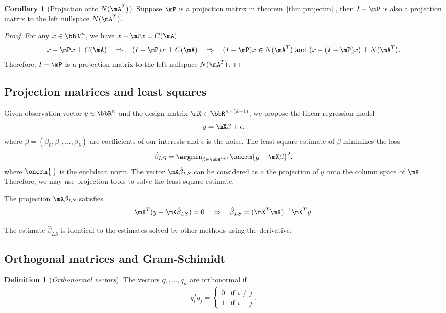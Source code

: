 \documentclass[11pt]{article}
\theoremstyle{plain}
\theoremstyle{definition}
\newtheorem{defn}{Definition}
\newtheorem{cor}{Corollary}
\begin{document}
\begin{cor}[Projection onto $N(\mA^T)$]\label{cor:iprojectm}
	Suppose $\mP$ is a projection matrix in theorem~\ref{thm:projectm} , then $I-\mP$ is also a projection matrix to the left nullspace $N(\mA^T)$. 
\end{cor}

\begin{proof}
	For any $x \in \bbR^m$, we have $x - \mP x \perp C(\mA)$
	\[ x - \mP x \perp C(\mA) \quad \Rightarrow \quad (I-\mP)x \perp C(\mA) \quad \Rightarrow \quad  (I-\mP)x \in N(\mA^T) \text{ and } (x - (I-\mP)x) \perp N(\mA^T). \]
	Therefore, $I-\mP$ is a projection matrix to the left nullspace $N(\mA^T)$.
\end{proof}

\subsection{Projection matrices and least squares}
Given observation vector $y \in \bbR^n$ and the design matrix $\mX \in \bbR^{n \times (k+1)}$, we propose the linear regression model
\[ y = \mX \beta +\epsilon,\]
where $\beta = (\beta_0,\beta_1,...,\beta_k)$ are coefficients of our interests and $\epsilon$ is the noise. The least square estimate of $\beta$ minimizes the loss
\[  \hat \beta_{LS} = \argmin_{\beta \in \bbR^{k+1}} \onorm{y - \mX \beta}^2, \]
where $\onorm{\cdot}$ is the euclidean norm. The vector $\mX 
\hat \beta_{LS}$ can be considered as a the projection of $y$ onto the column space of $\mX$. Therefore, we may use projection tools to solve the least square estimate. 

The projection $\mX \hat \beta_{LS}$ satisfies
\[ \mX^T( y - \mX \hat \beta_{LS} ) = 0 \quad \Rightarrow \quad \hat \beta_{LS} = (\mX^T \mX)^{-1} \mX^T y. \]

The estimate $\hat \beta_{LS}$ is identical to the estimates solved by other methods  using the derivative. 

\subsection{Orthogonal matrices and Gram-Schimidt}
\begin{defn}[\textit{Orthonormal vectors}]\label{def:othronov}
	The vectors $q_1,...,q_n$ are orthonormal if
	\begin{align}
		q_i^T q_j = \begin{cases}
			0& \text{if } i\neq j\\
			1 & \text{if } i =  j
		\end{cases}.
	\end{align}
\end{defn}
\end{document}
